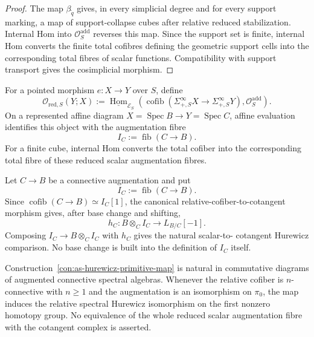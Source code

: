\begin{proof}
The map $\beta_{\widetilde q}$ gives, in every simplicial degree and for every
support marking, a map of support-collapse cubes after relative reduced
stabilization.  Internal Hom into $\mathcal O_S^{\mathrm{add}}$ reverses this
map.  Since the support set is finite, internal Hom converts the finite total
cofibres defining the geometric support cells into the corresponding total
fibres of scalar functions.  Compatibility with support transport gives the
cosimplicial morphism.
\end{proof}

\begin{definition}
\label{def:as-reduced-scalar-dual}
For a pointed morphism $e:X\to Y$ over $S$, define
\[
\boxed{
    \mathscr O_{\mathrm{red},S}(Y;X)
    :=
    \underline{\operatorname{Hom}}_{\mathcal E_S}
    \left(
        \operatorname{cofib}
        (\Sigma_{+,S}^{\infty}X\to\Sigma_{+,S}^{\infty}Y),
        \mathcal O_S^{\mathrm{add}}
    \right).
}
\]
On a represented affine diagram
$X=\operatorname{Spec}B\to Y=\operatorname{Spec}C$, affine evaluation
identifies this object with the augmentation fibre
\[
    I_C:=\operatorname{fib}(C\to B).
\]
For a finite cube, internal Hom converts the total cofiber into the
corresponding total fibre of these reduced scalar augmentation fibres.
\end{definition}

\begin{construction}
\label{con:as-hurewicz-primitive-map}
Let $C\to B$ be a connective augmentation and put
\[
    I_C:=\operatorname{fib}(C\to B).
\]
Since $\operatorname{cofib}(C\to B)\simeq I_C[1]$, the canonical
relative-cofiber-to-cotangent morphism gives, after base change and shifting,
\[
\boxed{
    h_C:
    B\otimes_C I_C
    \longrightarrow
    L_{B/C}[-1].
}
\]
Composing $I_C\to B\otimes_CI_C$ with $h_C$ gives the natural scalar-to-
cotangent Hurewicz comparison.  No base change is built into the definition of
$I_C$ itself.
\end{construction}

\begin{proposition}
\label{prop:as-hurewicz-primitive-naturality}
Construction~\ref{con:as-hurewicz-primitive-map} is natural in commutative
diagrams of augmented connective spectral algebras.  Whenever the relative
cofiber is $n$-connective with $n\geq1$ and the augmentation is an isomorphism
on $\pi_0$, the map induces the relative spectral Hurewicz isomorphism on the
first nonzero homotopy group.  No equivalence of the whole reduced scalar
augmentation fibre with the cotangent complex is asserted.
\end{proposition}

